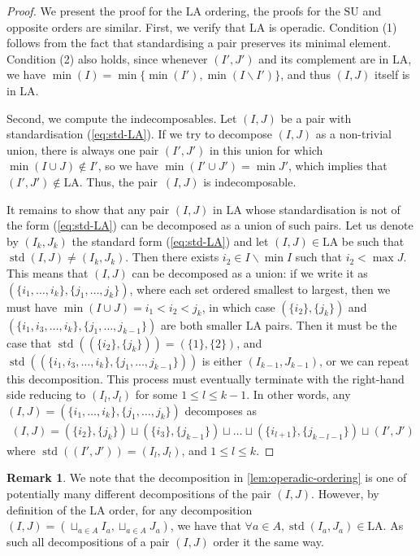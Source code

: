 \documentclass{amsart}
\theoremstyle{definition}
\newtheorem{remark}[theorem]{Remark}
\newcommand{\ssm}{\smallsetminus} %
\DeclareMathOperator{\std}{std}
\newcommand{\SU}{\mathrm{SU}}
\newcommand{\LA}{\mathrm{LA}}
\begin{document}
\begin{proof}
We present the proof for the $\LA$ ordering, the proofs for the $\SU$ and opposite orders are similar.
First, we verify that $\LA$ is operadic. 
Condition (1) follows from the fact that standardising a pair preserves its minimal element.
Condition (2) also holds, since whenever $(I',J')$ and its complement are in $\LA$, we have $\min(I)=\min\{\min(I'),\min(I\ssm I')\}$, and thus $(I,J)$ itself is in $\LA$.

Second, we compute the indecomposables. 
Let $(I,J)$ be a pair with standardisation (\ref{eq:std-LA}).
If we try to decompose $(I,J)$ as a non-trivial union, there is always one pair $(I',J')$ in this union for which~$\min (I\cup J) \notin I'$, so we have $\min ( I' \cup J') = \min J'$, which implies that $(I',J') \notin \LA$.
Thus, the pair~$(I,J)$ is indecomposable. 

It remains to show that any pair $(I,J)$ in $\LA$ whose standardisation is not of the form (\ref{eq:std-LA}) can be decomposed as a union of such pairs. 
Let us denote by $(I_k,J_k)$ the standard form (\ref{eq:std-LA}) and let $(I,J)\in \LA$ be such that $\std(I,J) \neq (I_k,J_k)$.
Then there exists $i_2 \in I\ssm \min I$ such that $i_2 < \max J$.
This means that $(I,J)$ can be decomposed as a union: if we write it as $(\{i_1,\dots,i_k\},\{j_1,\dots,j_k\})$, where each set ordered smallest to largest, then we must have $\min (I\cup J)=i_1<i_2<j_k$, in which case $(\{i_2\},\{j_k\})$ and $(\{i_1,i_3,\dots,i_k\},\{j_1,\dots,j_{k-1}\})$ are both smaller $\LA$ pairs.
Then it must be the case that $\std((\{i_2\},\{j_k\})) = (\{1\},\{2\})$, and $\std((\{i_1,i_3,\dots,i_k\},\{j_1,\dots,j_{k-1}\}))$ is either $(I_{k-1},J_{k-1})$, or we can repeat this decomposition.
This process must eventually terminate with the right-hand side reducing to $(I_l,J_l)$ for some $1 \leq l \leq k-1$.
In other words, any ${(I,J) = (\{i_1,\dots,i_k\}, \{j_1,\dots,j_k\})}$ decomposes as
\begin{align*}
	(I,J) = (\{i_2\},\{j_k\}) \sqcup (\{i_3\},\{j_{k-1}\}) \sqcup \dots \sqcup (\{i_{l+1} \},\{j_{k-l-1} \}) \sqcup (I',J')
\end{align*}
where $\std((I',J')) = (I_l,J_l)$, and $1\leq l \leq k$.
\end{proof}

\begin{remark}
We note that the decomposition in \cref{lem:operadic-ordering} is one of potentially many different decompositions of the pair $(I,J)$. 
However, by definition of the $\LA$ order, for any decomposition $(I,J) = (\sqcup_{a\in A} I_a, \sqcup_{a \in A} J_a)$, we have that $\forall a \in A, \std(I_a, J_a) \in \LA$.
As such all decompositions of a pair $(I,J)$ order it the same way.
\end{remark}
\end{document}
